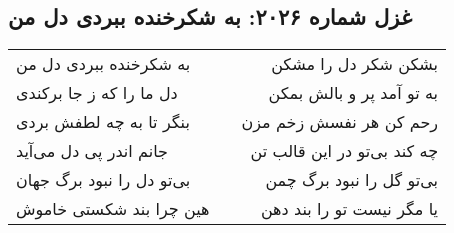 \begin{center}
\section*{غزل شماره ۲۰۲۶: به شکرخنده ببردی دل من}
\label{sec:2026}
\begin{longtable}{l p{0.5cm} r}
به شکرخنده ببردی دل من
&&
بشکن شکر دل را مشکن
\\
دل ما را که ز جا برکندی
&&
به تو آمد پر و بالش بمکن
\\
بنگر تا به چه لطفش بردی
&&
رحم کن هر نفسش زخم مزن
\\
جانم اندر پی دل می‌آید
&&
چه کند بی‌تو در این قالب تن
\\
بی‌تو دل را نبود برگ جهان
&&
بی‌تو گل را نبود برگ چمن
\\
هین چرا بند شکستی خاموش
&&
یا مگر نیست تو را بند دهن
\\
\end{longtable}
\end{center}
